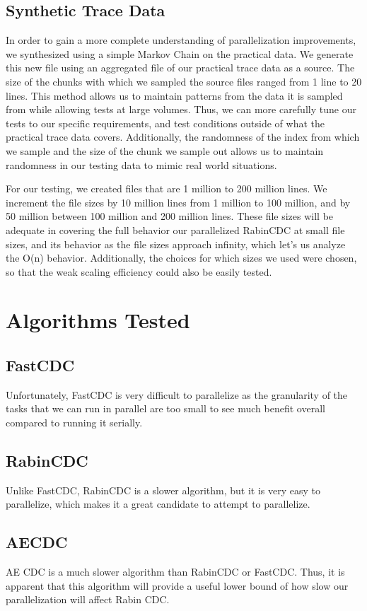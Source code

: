 \documentclass{acmtog} %
\begin{document}
	\subsection{Synthetic Trace Data}
	In order to gain a more complete understanding of parallelization improvements, we synthesized using a simple Markov Chain on the practical data. We generate this new file using an aggregated file of our practical trace data as a source. The size of the chunks with which we sampled the source files ranged from 1 line to 20 lines. This method allows us to maintain patterns from the data it is sampled from while allowing tests at large volumes. Thus, we can more carefully tune our tests to our specific requirements, and test conditions outside of what the practical trace data covers. Additionally, the randomness of the index from which we sample and the size of the chunk we sample out allows us to maintain randomness in our testing data to mimic real world situations.
	
	For our testing, we created files that are 1 million to 200 million lines. We increment the file sizes by 10 million lines from 1 million to 100 million, and by 50 million between 100 million and 200 million lines. These file sizes will be adequate in covering the full behavior our parallelized RabinCDC at small file sizes, and its behavior as the file sizes approach infinity, which let's us analyze the O(n) behavior. Additionally, the choices for which sizes we used were chosen, so that the weak scaling efficiency could also be easily tested.
	
	\section{Algorithms Tested}
	\subsection{FastCDC}
	Unfortunately, FastCDC is very difficult to parallelize as the granularity of the tasks that we can run in parallel are too small to see much benefit overall compared to running it serially. 
	\subsection{RabinCDC}
	Unlike FastCDC, RabinCDC is a slower algorithm, but it is very easy to parallelize, which makes it a great candidate to attempt to parallelize. 
	\subsection{AECDC}
	AE CDC is a much slower algorithm than RabinCDC or FastCDC. Thus, it is apparent that this algorithm will provide a useful lower bound of how slow our parallelization will affect Rabin CDC.
	
\end{document}

